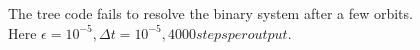 \begin{figure}
	\centering
	\caption{The tree code fails to resolve the binary system after a few orbits. Here $ 
	\epsilon = 10^{-5}, \Delta t = 10^{-5}, 4000 steps per output. $}
\end{figure}



%


